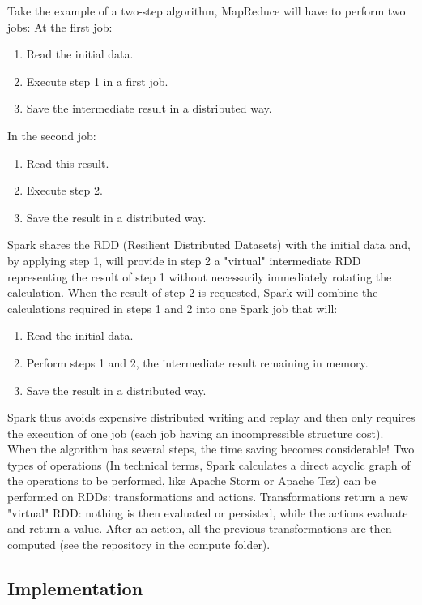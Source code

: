 \documentclass{acmtog} %
\begin{document}
Take the example of a two-step algorithm, MapReduce will have to perform two jobs:
At the first job:
\begin{enumerate}
\item	Read the initial data.
\item	Execute step 1 in a first job.
\item	Save the intermediate result in a distributed way.
\end{enumerate}
In the second job:
\begin{enumerate}
\item	Read this result.
\item	Execute step 2.
\item	Save the result in a distributed way.
\end{enumerate}
Spark shares the RDD (Resilient Distributed Datasets) with the initial data and, by applying step 1, will provide in step 2 a "virtual" intermediate RDD representing the result of step 1 without necessarily immediately rotating the calculation. When the result of step 2 is requested, Spark will combine the calculations required in steps 1 and 2 into one Spark job that will:
\begin{enumerate}
\item	Read the initial data.
\item	Perform steps 1 and 2, the intermediate result remaining in memory.
\item	Save the result in a distributed way.
\end{enumerate}
Spark thus avoids expensive distributed writing and replay and then only requires the execution of one job (each job having an incompressible structure cost).
When the algorithm has several steps, the time saving becomes considerable!
Two types of operations (In technical terms, Spark calculates a direct acyclic graph of the operations to be performed, like Apache Storm or Apache Tez) can be performed on RDDs: transformations and actions. Transformations return a new "virtual" RDD: nothing is then evaluated or persisted, while the actions evaluate and return a value. After an action, all the previous transformations are then computed (see the repository in the compute folder).


\subsection{Implementation}
\label{sec:implementation}
\end{document}
